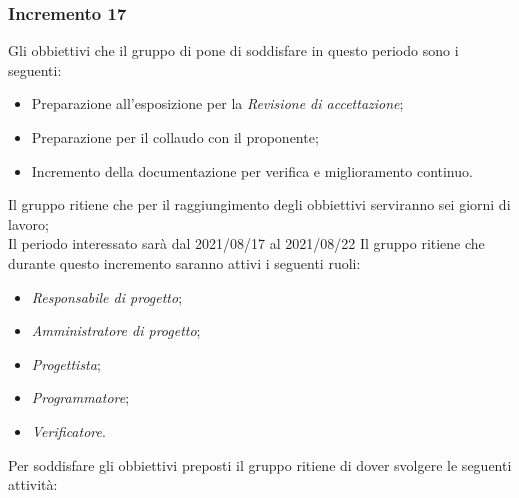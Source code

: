 \subsubsection{Incremento 17}
Gli obbiettivi che il gruppo di pone di soddisfare in questo periodo sono i seguenti:
\begin{itemize}
    \item Preparazione all'esposizione per la \textit{Revisione di accettazione};
    \item Preparazione per il collaudo con il proponente;
    \item Incremento della documentazione per verifica e miglioramento continuo.
\end{itemize}
Il gruppo ritiene che per il raggiungimento degli obbiettivi serviranno sei giorni di lavoro;\\
Il periodo interessato sarà dal 2021/08/17 al 2021/08/22
Il gruppo ritiene che durante questo incremento saranno attivi i seguenti ruoli:
\begin{itemize}
    \item \textit{Responsabile di progetto};
    \item \textit{Amministratore di progetto};
    \item \textit{Progettista};
    \item \textit{Programmatore};
    \item \textit{Verificatore}.
\end{itemize}
Per soddisfare gli obbiettivi preposti il gruppo ritiene di dover svolgere le seguenti attività:
